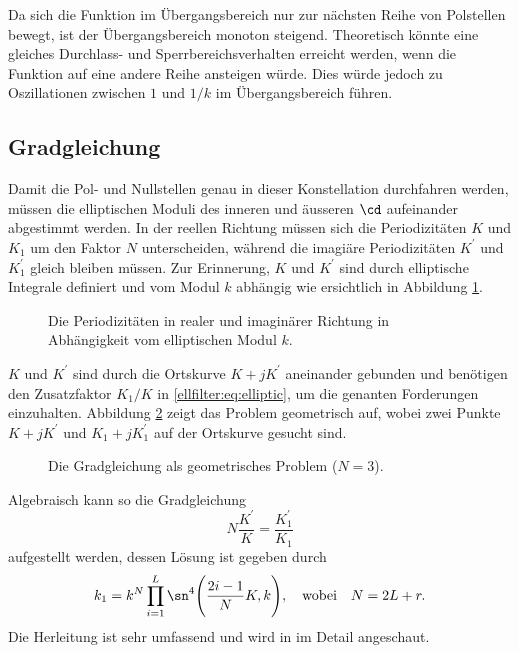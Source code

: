 Da sich die Funktion im Übergangsbereich nur zur nächsten Reihe von Polstellen bewegt, ist der Übergangsbereich monoton steigend.
Theoretisch könnte eine gleiches Durchlass- und Sperrbereichsverhalten erreicht werden, wenn die Funktion auf eine andere Reihe ansteigen würde.
Dies würde jedoch zu Oszillationen zwischen $1$ und $1/k$ im Übergangsbereich führen.

\subsection{Gradgleichung}

Damit die Pol- und Nullstellen genau in dieser Konstellation durchfahren werden, müssen die elliptischen Moduli des inneren und äusseren $\cd$ aufeinander abgestimmt werden.
In der reellen Richtung müssen sich die Periodizitäten $K$ und $K_1$ um den Faktor $N$ unterscheiden, während die imagiäre Periodizitäten $K^\prime$ und $K^\prime_1$ gleich bleiben müssen.
Zur Erinnerung, $K$ und $K^\prime$ sind durch elliptische Integrale definiert und vom Modul $k$ abhängig wie ersichtlich in Abbildung \ref{ellfilter:fig:kprime}.
\begin{figure}
    \centering
    
    \caption{Die Periodizitäten in realer und imaginärer Richtung in Abhängigkeit vom elliptischen Modul $k$.}
    \label{ellfilter:fig:kprime}
\end{figure}
$K$ und $K^\prime$ sind durch die Ortskurve $K + jK^\prime$ aneinander gebunden und benötigen den Zusatzfaktor $K_1/K$ in \eqref{ellfilter:eq:elliptic}, um die genanten Forderungen einzuhalten.
Abbildung \ref{ellfilter:fig:degree_eq} zeigt das Problem geometrisch auf, wobei zwei Punkte $K+jK^\prime$ und $K_1+jK_1^\prime$ auf der Ortskurve gesucht sind.
\begin{figure}
    \centering
    
    \caption{Die Gradgleichung als geometrisches Problem ($N=3$).}
    \label{ellfilter:fig:degree_eq}
\end{figure}
Algebraisch kann so die Gradgleichung
\begin{equation}
    N \frac{K^\prime}{K} = \frac{K^\prime_1}{K_1}
\end{equation}
aufgestellt werden, dessen Lösung ist gegeben durch
\begin{equation}\label{ellfilter:eq:degeqsol}
k_1 = k^N \prod_{i=1}^L \sn^4 \Bigg( \frac{2i - 1}{N} K, k \Bigg),
\quad \text{wobei} \quad
N = 2L+r.
\end{equation}
Die Herleitung ist sehr umfassend und wird in \cite{ellfilter:bib:orfanidis} im Detail angeschaut.

